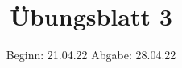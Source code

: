 

\title{Übungsblatt 3}
\date{%
  Beginn: 21.04.22
  \hspace{3em}
  Abgabe: 28.04.22
}



\maketitle
\thispagestyle{empty}
\tableofcontents
\newpage







